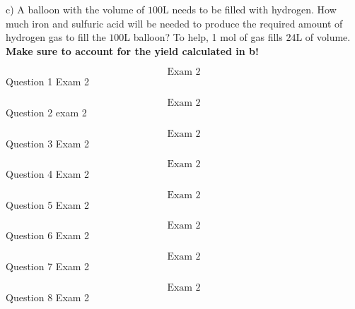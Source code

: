 \documentclass{article}
\begin{document}
    c) A balloon with the volume of $100 \si{\liter}$ needs to be filled with hydrogen. How much iron and sulfuric acid will be needed to produce the required amount of hydrogen gas to fill the $100 \si{\liter}$ balloon? To help, 1 $\si{\mole}$ of gas fills $24 \si{\liter}$ of volume. \textbf{Make sure to account for the yield calculated in b!}

    \pagebreak


    $$\text{Exam 2}$$
    Question 1 Exam 2
    \pagebreak

    $$\text{Exam 2}$$
    Question 2 exam 2
    \pagebreak

    $$\text{Exam 2}$$
    Question 3 Exam 2
    \pagebreak


    $$\text{Exam 2}$$
    Question 4 Exam 2
    \pagebreak


    $$\text{Exam 2}$$
    Question 5 Exam 2
    \pagebreak

    $$\text{Exam 2}$$
    Question 6 Exam 2
    \pagebreak

    $$\text{Exam 2}$$
    Question 7 Exam 2
    \pagebreak

    $$\text{Exam 2}$$
    Question 8 Exam 2
    \pagebreak
\end{document}
